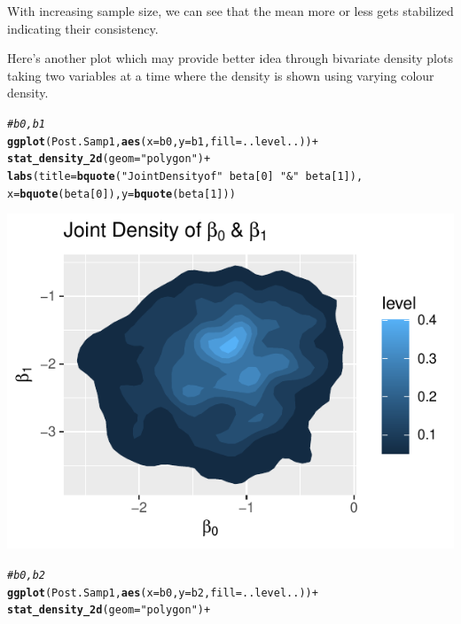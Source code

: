 \documentclass[11pt,english]{article}\usepackage[]{graphicx}\usepackage[]{xcolor}
\makeatletter
\def\maxwidth{ %
  \ifdim\Gin@nat@width>\linewidth
    \linewidth
  \else
    \Gin@nat@width
  \fi
}
\newcommand{\hlnum}[1]{\textcolor[rgb]{0.686,0.059,0.569}{#1}}%
\newcommand{\hlstr}[1]{\textcolor[rgb]{0.192,0.494,0.8}{#1}}%
\newcommand{\hlcom}[1]{\textcolor[rgb]{0.678,0.584,0.686}{\textit{#1}}}%
\newcommand{\hlopt}[1]{\textcolor[rgb]{0,0,0}{#1}}%
\newcommand{\hlstd}[1]{\textcolor[rgb]{0.345,0.345,0.345}{#1}}%
\newcommand{\hlkwc}[1]{\textcolor[rgb]{0.333,0.667,0.333}{#1}}%
\newcommand{\hlkwd}[1]{\textcolor[rgb]{0.737,0.353,0.396}{\textbf{#1}}}%
\newenvironment{kframe}{%
 \def\at@end@of@kframe{}%
 \ifinner\ifhmode%
  \def\at@end@of@kframe{\end{minipage}}%
  \begin{minipage}{\columnwidth}%
 \fi\fi%
 \def\FrameCommand##1{\hskip\@totalleftmargin \hskip-\fboxsep
 \colorbox{shadecolor}{##1}\hskip-\fboxsep
     \hskip-\linewidth \hskip-\@totalleftmargin \hskip\columnwidth}%
 \MakeFramed {\advance\hsize-\width
   \@totalleftmargin\z@ \linewidth\hsize
   \@setminipage}}%
 {\par\unskip\endMakeFramed%
 \at@end@of@kframe}
\newenvironment{knitrout}{}{} %
\makeatother
\begin{document}
With increasing sample size, we can see that the mean more or less
gets stabilized indicating their consistency.

Here's another plot which may provide better idea through bivariate
density plots taking two variables at a time where the density is
shown using varying colour density.
\begin{center}
\begin{knitrout}
\color{fgcolor}\begin{kframe}
\begin{alltt}
\hlcom{# b0,b1}
\hlkwd{ggplot}\hlstd{(Post.Samp1,} \hlkwd{aes}\hlstd{(}\hlkwc{x} \hlstd{= b0,} \hlkwc{y} \hlstd{= b1,} \hlkwc{fill} \hlstd{= ..level..))} \hlopt{+}
  \hlkwd{stat_density_2d}\hlstd{(}\hlkwc{geom} \hlstd{=} \hlstr{"polygon"}\hlstd{)} \hlopt{+}
\hlkwd{labs}\hlstd{(}\hlkwc{title} \hlstd{=} \hlkwd{bquote}\hlstd{(}\hlstr{"Joint Density of"} \hlopt{~} \hlstd{beta[}\hlnum{0}\hlstd{]} \hlopt{~} \hlstr{"&"} \hlopt{~} \hlstd{beta[}\hlnum{1}\hlstd{]),}
\hlkwc{x} \hlstd{=} \hlkwd{bquote}\hlstd{(beta[}\hlnum{0}\hlstd{]),} \hlkwc{y} \hlstd{=} \hlkwd{bquote}\hlstd{(beta[}\hlnum{1}\hlstd{]))}
\end{alltt}
\end{kframe}
\includegraphics[width=\maxwidth]{figure/unnamed-chunk-11-1} 
\begin{kframe}\begin{alltt}
\hlcom{# b0,b2}
\hlkwd{ggplot}\hlstd{(Post.Samp1,} \hlkwd{aes}\hlstd{(}\hlkwc{x} \hlstd{= b0,} \hlkwc{y} \hlstd{= b2,} \hlkwc{fill} \hlstd{= ..level..))} \hlopt{+}
  \hlkwd{stat_density_2d}\hlstd{(}\hlkwc{geom} \hlstd{=} \hlstr{"polygon"}\hlstd{)} \hlopt{+}

\end{alltt}
\end{kframe}
\end{knitrout}
\end{center}
\end{document}
